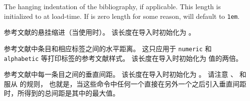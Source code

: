 \begin{ltxsyntax}


The hanging indentation of the bibliography, if applicable. This length is initialized to  at load-time. If  is zero length for some reason,  will default to \texttt{1em}.


参考文献的悬挂缩进（当使用时）。
该长度在导入时初始化为 。



参考文献中条目和相应标签之间的水平距离。
这只应用于 \texttt{numeric} 和 \texttt{alphabetic} 等打印标签的参考文献样式。
该长度在导入时初始化为  值的两倍。



参考文献中每一条目之间的垂直间距。
该长度在导入时初始化为 。
请注意 、 和  服从  的规则，
也就是，当这些命令中任何一个直接在另外一个之后引入垂直间距时，所得到的总间距是其中的最大值。




\end{ltxsyntax}
